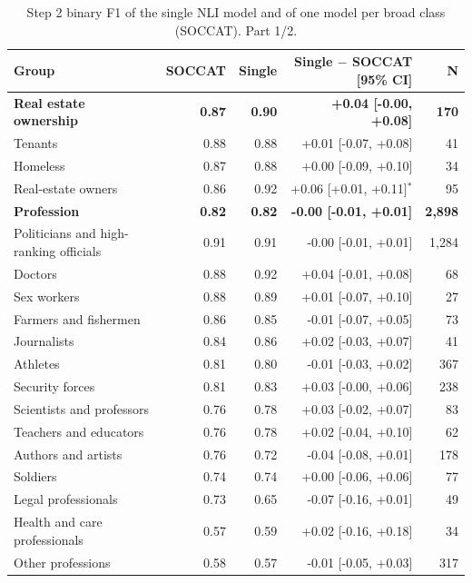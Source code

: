 \begin{table}[htbp]
\centering
\scriptsize
\begin{threeparttable}
\caption{Step 2 binary F1 of the single NLI model and of one model per broad class (SOCCAT). Part 1/2.}
\label{tab:single_nli_vs_main_part1}
\begin{tabular}{l rr r r}
\toprule
Group & SOCCAT & Single & Single $-$ SOCCAT [95\% CI] & N \\
\midrule
\textbf{Real estate ownership} & \textbf{0.87} & \textbf{0.90} & \textbf{+0.04 [-0.00, +0.08]} & \textbf{170} \\
\quad Tenants & 0.88 & 0.88 & +0.01 [-0.07, +0.08] & 41 \\
\quad Homeless & 0.87 & 0.88 & +0.00 [-0.09, +0.10] & 34 \\
\quad Real-estate owners & 0.86 & 0.92 & +0.06 [+0.01, +0.11]$^{*}$ & 95 \\
\addlinespace
\textbf{Profession} & \textbf{0.82} & \textbf{0.82} & \textbf{-0.00 [-0.01, +0.01]} & \textbf{2,898} \\
\quad Politicians and high-ranking officials & 0.91 & 0.91 & -0.00 [-0.01, +0.01] & 1,284 \\
\quad Doctors & 0.88 & 0.92 & +0.04 [-0.01, +0.08] & 68 \\
\quad Sex workers & 0.88 & 0.89 & +0.01 [-0.07, +0.10] & 27 \\
\quad Farmers and fishermen & 0.86 & 0.85 & -0.01 [-0.07, +0.05] & 73 \\
\quad Journalists & 0.84 & 0.86 & +0.02 [-0.03, +0.07] & 41 \\
\quad Athletes & 0.81 & 0.80 & -0.01 [-0.03, +0.02] & 367 \\
\quad Security forces & 0.81 & 0.83 & +0.03 [-0.00, +0.06] & 238 \\
\quad Scientists and professors & 0.76 & 0.78 & +0.03 [-0.02, +0.07] & 83 \\
\quad Teachers and educators & 0.76 & 0.78 & +0.02 [-0.04, +0.10] & 62 \\
\quad Authors and artists & 0.76 & 0.72 & -0.04 [-0.08, +0.01] & 178 \\
\quad Soldiers & 0.74 & 0.74 & +0.00 [-0.06, +0.06] & 77 \\
\quad Legal professionals & 0.73 & 0.65 & -0.07 [-0.16, +0.01] & 49 \\
\quad Health and care professionals & 0.57 & 0.59 & +0.02 [-0.16, +0.18] & 34 \\
\quad Other professions & 0.58 & 0.57 & -0.01 [-0.05, +0.03] & 317 \\

\end{tabular}
\end{threeparttable}
\end{table}
